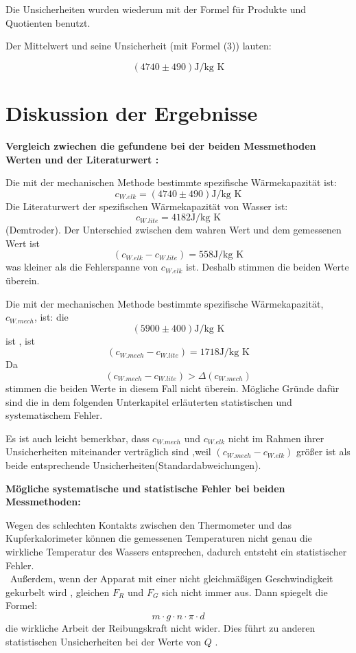 \documentclass[11pt,a4paper]{article} %
\begin{document}
Die Unsicherheiten wurden wiederum mit der Formel für Produkte und Quotienten benutzt. 

Der Mittelwert und seine Unsicherheit (mit Formel (3)) lauten:

$$ (4740 \pm 490) \textrm{J/kg K} $$

\section{Diskussion der Ergebnisse}

\textbf{Vergleich zwiechen die gefundene bei der beiden Messmethoden Werten und  der Literaturwert :}

Die mit der mechanischen Methode bestimmte spezifische Wärmekapazität ist:
$$c_{W.elk}= (4740 \pm 490) \textrm{J/kg K}$$
Die Literaturwert der spezifischen Wärmekapazität von Wasser ist: 
$$ c_{W.lite} = 4182  \textrm{J/kg K}$$ 
(Demtroder). 
Der Unterschied zwischen dem wahren Wert und dem gemessenen Wert ist
$$( c_{W.elk}-c_{W.lite})=558 \textrm{J/kg K} $$
was kleiner als die Fehlerspanne von $c_{W.elk}$ ist. 
Deshalb stimmen die beiden Werte überein. 

Die mit der mechanischen Methode bestimmte spezifische Wärmekapazität,$c_{W.mech}$, ist:   die $$(5900 \pm 400) \textrm{J/kg K}  $$ ist , ist $$( c_{W.mech}-c_{W.lite})
=1718 \textrm{J/kg K} $$
Da
 $$( c_{W.mech}-c_{W.lite}) > \Delta(c_{W.mech})$$ 
stimmen die beiden Werte in diesem Fall nicht überein.
M\"ogliche Gr\"unde daf\"ur sind die in dem folgenden Unterkapitel erläuterten statistischen und systematischem Fehler.

Es ist auch leicht bemerkbar, dass $c_{W.mech}$ und $c_{W.elk}$ nicht im Rahmen
ihrer Unsicherheiten miteinander verträglich sind ,weil 
$(c_{W.mech}-c_{W.elk}) $ größer ist als beide entsprechende Unsicherheiten(Standardabweichungen). 


\textbf{M\"ogliche systematische und statistische Fehler bei beiden Messmethoden:}

Wegen des schlechten Kontakts zwischen den Thermometer und das Kupferkalorimeter können die gemessenen Temperaturen nicht genau die wirkliche Temperatur des Wassers entsprechen, dadurch entsteht ein statistischer Fehler.\\\
Außerdem, wenn der Apparat mit einer nicht gleichm\"aßigen Geschwindigkeit gekurbelt wird , gleichen $F_{R}$ und  $F_{G}$ sich nicht immer aus. Dann spiegelt die Formel:
$$m\cdot g \cdot n \cdot \pi \cdot d $$ 
 die wirkliche Arbeit der Reibungskraft nicht wider. Dies führt zu anderen statistischen Unsicherheiten bei der Werte von $Q$ . 
\end{document}
